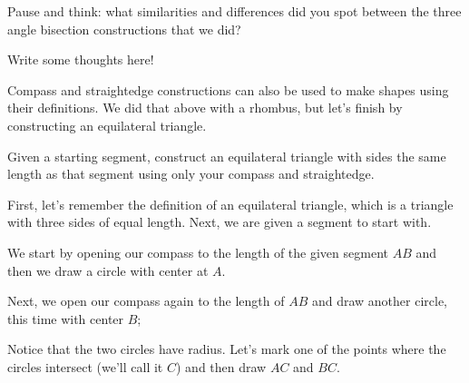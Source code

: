 \documentclass{ximera}
\begin{document}
\begin{question}
Pause and think: what similarities and differences did you spot between the three angle bisection constructions that we did?
\begin{freeResponse}
Write some thoughts here!
\end{freeResponse}
\end{question}

Compass and straightedge constructions can also be used to make shapes using their definitions. We did that above with a rhombus, but let's finish by constructing an equilateral triangle.
\begin{example}
Given a starting segment, construct an equilateral triangle with sides the same length as that segment using only your compass and straightedge.

First, let's remember the definition of an equilateral triangle, which is a triangle with three sides of equal length. Next, we are given a segment to start with.
\begin{center}
\end{center}
We start by opening our compass to the length of the given segment $AB$ and then we draw a circle with center at $A$.
\begin{center}
\end{center}
Next, we open our compass again to the length of $AB$ and draw another circle, this time with center $B$;
\begin{center}
\end{center}
Notice that the two circles have  radius. Let's mark one of the points where the circles intersect (we'll call it $C$) and then draw $AC$ and $BC$.

\end{example}
\end{document}
